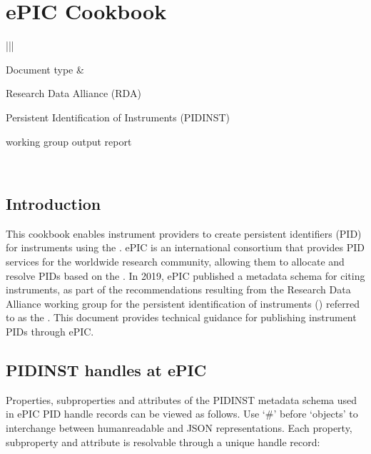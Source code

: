 \documentclass[a4paper,10pt,english]{sphinxmanual}
\begin{document}
\chapter{ePIC Cookbook}
\label{\detokenize{epic-cookbook/index:epic-cookbook}}\label{\detokenize{epic-cookbook/index:id1}}\label{\detokenize{epic-cookbook/index::doc}}

\begin{savenotes}\sphinxattablestart
\centering
\begin{tabular}[t]{|*{2}{|}}
\hline

\sphinxAtStartPar
Document type
&
\begin{DUlineblock}{0em}
\item[] Research Data Alliance (RDA)
\item[] Persistent Identification of Instruments (PIDINST)
\item[] working group output report
\end{DUlineblock}
\\
\hline
\end{tabular}
\par
\sphinxattableend\end{savenotes}


\section{Introduction}
\label{\detokenize{epic-cookbook/intro:introduction}}\label{\detokenize{epic-cookbook/intro::doc}}
\sphinxAtStartPar
This cookbook enables instrument providers to create persistent
identifiers (PID) for instruments using the .
ePIC is an international consortium that provides PID services for the
worldwide research community, allowing them to allocate and resolve
PIDs based on the .  In 2019, ePIC published a
metadata schema for citing instruments, as part of the recommendations
resulting from the Research Data Alliance working group for the
persistent identification of instruments () referred to as
the .  This document provides technical
guidance for publishing instrument PIDs through ePIC.


\section{PIDINST handles at ePIC}
\label{\detokenize{epic-cookbook/handles:pidinst-handles-at-epic}}\label{\detokenize{epic-cookbook/handles::doc}}
\sphinxAtStartPar
Properties, sub\sphinxhyphen{}properties and attributes of the PIDINST metadata
schema used in ePIC PID handle records can be viewed as follows.  Use
‘\#’ before ‘objects’ to interchange between human\sphinxhyphen{}readable and JSON
representations.  Each property, sub\sphinxhyphen{}property and attribute is
resolvable through a unique handle record:
\end{document}
